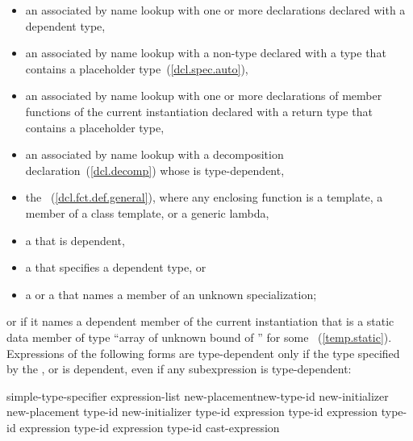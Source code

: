 \begin{itemize}
\item
an
associated by name lookup with one or more declarations
declared with a dependent type,

\item
an
associated by name lookup with
a non-type 
declared with a type
that contains a placeholder type~(\ref{dcl.spec.auto}),

\item
an  associated by name lookup with one or more
declarations of member functions of the current instantiation declared
with a return type that contains a placeholder type,

\item
an  associated by name lookup with a decomposition
declaration~(\ref{dcl.decomp}) whose 
is type-dependent,

\item
the
~(\ref{dcl.fct.def.general}), where any enclosing function is a
template, a member of a class template, or a generic lambda,

\item
a
that is dependent,

\item
a
that specifies a dependent type, or

\item
a
or a
that names a member of an unknown specialization;
\end{itemize}

or if it names a dependent member of the current instantiation that is a static
data member of type
``array of unknown bound of '' for some ~(\ref{temp.static}).
Expressions of the following forms are type-dependent only if the type
specified by the
,
or
is dependent, even if any subexpression is type-dependent:

\begin{ncbnftab}
simple-type-specifier \terminal{(} expression-list\opt{} \terminal{)}\br
{} new-placement\opt new-type-id new-initializer\opt\br
{} new-placement\opt{} \terminal{(} type-id \terminal{)} new-initializer\opt\br
{} type-id \terminal{> (} expression \terminal{)}\br
{} type-id \terminal{> (} expression \terminal{)}\br
{} type-id \terminal{> (} expression \terminal{)}\br
{} type-id \terminal{> (} expression \terminal{)}\br
\terminal{(} type-id \terminal{)} cast-expression
\end{ncbnftab}

